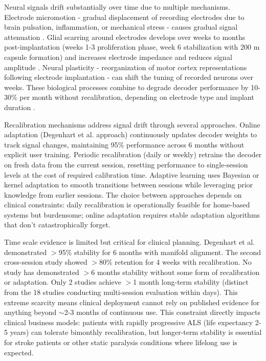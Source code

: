 Neural signals drift substantially over time due to multiple mechanisms. Electrode micromotion - gradual displacement of recording electrodes due to brain pulsation, inflammation, or mechanical stress - causes gradual signal attenuation \cite{Vansteensel2023}. Glial scarring around electrodes develops over weeks to months post-implantation (weeks 1-3 proliferation phase, week 6 stabilization with 200 \textmu{}m capsule formation) and increases electrode impedance and reduces signal amplitude \cite{GlialScar2014,Vansteensel2023}. Neural plasticity - reorganization of motor cortex representations following electrode implantation - can shift the tuning of recorded neurons over weeks. These biological processes combine to degrade decoder performance by 10-30\% per month without recalibration, depending on electrode type and implant duration \cite{Degenhart2020}.

Recalibration mechanisms address signal drift through several approaches. Online adaptation (Degenhart et al. approach) continuously updates decoder weights to track signal changes, maintaining 95\% performance across 6 months without explicit user training. Periodic recalibration (daily or weekly) retrains the decoder on fresh data from the current session, resetting performance to single-session levels at the cost of required calibration time. Adaptive learning uses Bayesian or kernel adaptation to smooth transitions between sessions while leveraging prior knowledge from earlier sessions. The choice between approaches depends on clinical constraints: daily recalibration is operationally feasible for home-based systems but burdensome; online adaptation requires stable adaptation algorithms that don't catastrophically forget.

Time scale evidence is limited but critical for clinical planning. Degenhart et al. demonstrated $>$95\% stability for 6 months with manifold alignment. The second cross-session study showed $>$80\% retention for 4 weeks with recalibration. No study has demonstrated $>$6 months stability without some form of recalibration or adaptation. Only 2 studies achieve $>$1 month long-term stability (distinct from the 18 studies conducting multi-session evaluation within days). This extreme scarcity means clinical deployment cannot rely on published evidence for anything beyond $\sim$2-3 months of continuous use. This constraint directly impacts clinical business models: patients with rapidly progressive ALS (life expectancy 2-5 years) can tolerate bimonthly recalibration, but longer-term stability is essential for stroke patients or other static paralysis conditions where lifelong use is expected.

